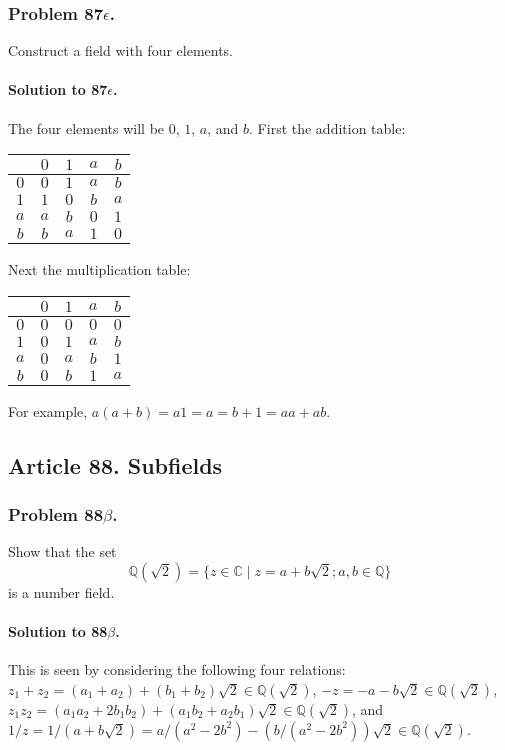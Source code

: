 \subsubsection{Problem 87$\epsilon$.}
Construct a field with four elements.

\paragraph*{Solution to 87$\epsilon$.}
The four elements will be $0$, $1$, $a$, and $b$. First the addition table:

\begin{center}
\begin{tabular}{c|cccc}
    & $0$ & $1$ & $a$ & $b$ \\
\hline
$0$ & $0$ & $1$ & $a$ & $b$ \\
$1$ & $1$ & $0$ & $b$ & $a$ \\
$a$ & $a$ & $b$ & $0$ & $1$ \\
$b$ & $b$ & $a$ & $1$ & $0$
\end{tabular}
\end{center}

Next the multiplication table:

\begin{center}
\begin{tabular}{c|cccc}
    & $0$ & $1$ & $a$ & $b$ \\
\hline
$0$ & $0$ & $0$ & $0$ & $0$ \\
$1$ & $0$ & $1$ & $a$ & $b$ \\
$a$ & $0$ & $a$ & $b$ & $1$ \\
$b$ & $0$ & $b$ & $1$ & $a$
\end{tabular}
\end{center}

For example, $a(a+b) = a1 = a = b+1 = aa + ab$.
\subsection{Article 88. Subfields}
\subsubsection{Problem 88$\beta$.}
Show that the set
$$\mathbb{Q}(\sqrt{2}) = \{ z \in \mathbb{C} \mid z = a + b \sqrt{2} ;
a, b \in \mathbb{Q} \} $$
is a number field.

\paragraph{Solution to 88$\beta$.}
This is seen by considering the following four relations:
$ z_1 + z_2 = (a_1 + a_2) + (b_1 + b_2)\sqrt{2} \in \mathbb{Q}(\sqrt{2}) $,
$ -z = -a - b\sqrt{2} \in \mathbb{Q}(\sqrt{2}) $,
$ z_1 z_2 = (a_1 a_2 + 2 b_1 b_2) + (a_1 b_2 + a_2 b_1) \sqrt{2} \in \mathbb{Q}(\sqrt{2}) $,
and $ 1/z = 1 / (a + b\sqrt{2}) = a/(a^2 - 2 b^2) - (b/(a^2 - 2 b^2))\sqrt{2} \in \mathbb{Q}(\sqrt{2}) $.

